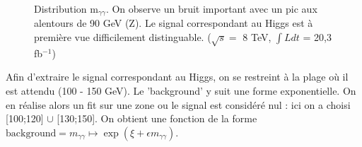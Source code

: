 \documentclass[11pt]{article} %
\begin{document}
\begin{figure}[H]
\centering
  \caption{Distribution m$_{\gamma \gamma}$. On observe un bruit important avec un pic aux alentours de 90 GeV (Z). Le signal correspondant au Higgs est à première vue difficilement distinguable. ($\sqrt{s} =$ 8 TeV,  $\int L dt$ = 20,3 fb$^{-1}$) }
 \resizebox{.8\linewidth}{!}{}
\end{figure}

%
%
%
%
%
%
%

Afin d'extraire le signal correspondant au Higgs, on se restreint à la plage où il est attendu (100 - 150 GeV). Le 'background' y suit une forme exponentielle. On en réalise alors un fit sur une zone ou le signal est considéré nul : ici on a choisi [100;120] $\cup$  [130;150]. On obtient une fonction de la forme $\textrm{background} = m_{\gamma\gamma} \mapsto \exp(\xi + \epsilon m_{\gamma\gamma})$.
\end{document}
